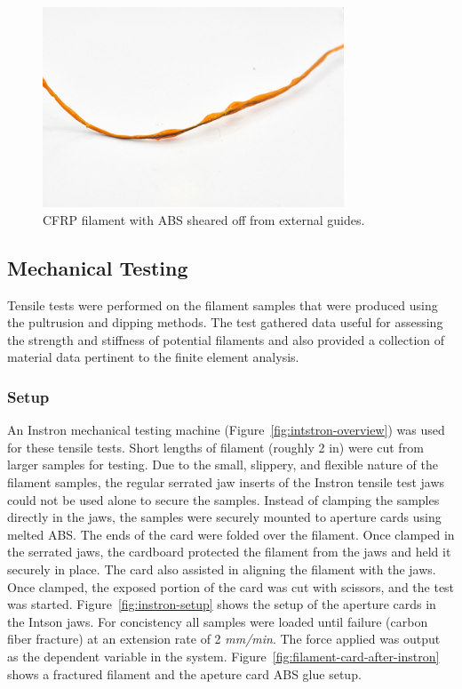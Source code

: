 \begin{figure}[htp]
    \centering
    \includegraphics[width=0.8\textwidth]{./figures/filament-dipping-shear}
    \caption{CFRP filament with ABS sheared off from external guides.}
    \label{fig:filament-dipping-shear}
\end{figure}

\clearpage

\subsection{Mechanical Testing}

\indent

Tensile tests were performed on the filament samples that were produced using the pultrusion and dipping methods. The test gathered data useful for assessing the strength and stiffness of potential filaments and also provided a collection of material data pertinent to the finite element analysis.\\

\subsubsection{Setup}

\indent

An Instron mechanical testing machine (Figure~\ref{fig:intstron-overview}) was used for these tensile tests. Short lengths of filament (roughly 2 in) were cut from larger samples for testing. Due to the small, slippery,  and flexible nature of the filament samples, the regular serrated jaw inserts of the Instron tensile test jaws could not be used alone to secure the samples. Instead of clamping the samples directly in the jaws, the samples were securely mounted to aperture cards using melted ABS. The ends of the card were folded over the filament. Once clamped in the serrated jaws, the cardboard protected the filament from the jaws and held it securely in place. The card also assisted in aligning the filament with the jaws. Once clamped, the exposed portion of the card was cut with scissors, and the test was started. Figure~\ref{fig:instron-setup} shows the setup of the aperture cards in the Intson jaws. For concistency all samples were loaded until failure (carbon fiber fracture) at an extension rate of 2 \textit{mm/min}. The force applied was output as the dependent variable in the system. Figure~\ref{fig:filament-card-after-instron} shows a fractured filament and the apeture card ABS glue setup.\\

